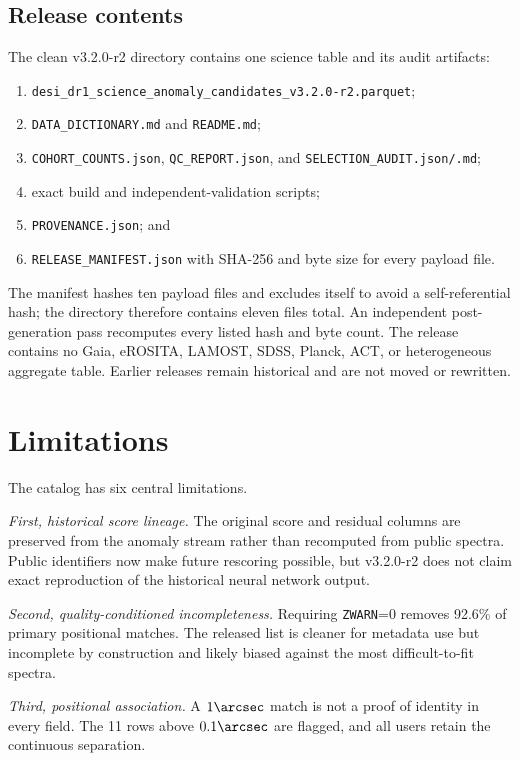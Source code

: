 \documentclass[twocolumn]{aastex701}
\newcommand{\releaseVersion}{v3.2.0-r2}
\begin{document}
\subsection{Release contents}\label{sec:release}

The clean \releaseVersion{} directory contains one science table and its audit artifacts:
\begin{enumerate}
\item \nolinkurl{desi_dr1_science_anomaly_candidates_v3.2.0-r2.parquet};
\item \texttt{DATA\_DICTIONARY.md} and \texttt{README.md};
\item \texttt{COHORT\_COUNTS.json}, \texttt{QC\_REPORT.json}, and
\texttt{SELECTION\_AUDIT.json/.md};
\item exact build and independent-validation scripts;
\item \texttt{PROVENANCE.json}; and
\item \texttt{RELEASE\_MANIFEST.json} with SHA-256 and byte size for every payload file.
\end{enumerate}
The manifest hashes ten payload files and excludes itself to avoid a self-referential hash;
the directory therefore contains eleven files total.  An independent post-generation
pass recomputes every listed hash and byte count.  The release contains no Gaia, eROSITA, LAMOST,
SDSS, Planck, ACT, or heterogeneous aggregate table.  Earlier releases remain historical and are
not moved or rewritten.

\section{Limitations}\label{sec:limitations}

The catalog has six central limitations.

\textit{First, historical score lineage.}  The original score and residual columns are preserved
from the anomaly stream rather than recomputed from public spectra.  Public identifiers now make
future rescoring possible, but \releaseVersion{} does not claim exact reproduction of the historical neural
network output.

\textit{Second, quality-conditioned incompleteness.}  Requiring \texttt{ZWARN}=0 removes 92.6\%
of primary positional matches.  The released list is cleaner for metadata use but incomplete by
construction and likely biased against the most difficult-to-fit spectra.

\textit{Third, positional association.}  A $1\arcsec$ match is not a proof of identity in every
field.  The 11 rows above $0.1\arcsec$ are flagged, and all users retain the continuous separation.
\end{document}
